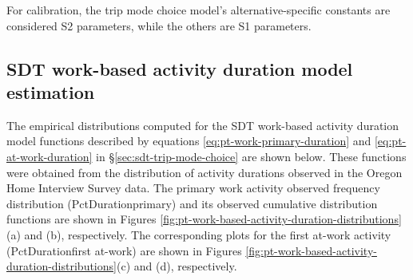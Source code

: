 For calibration, the trip mode choice model's alternative-specific constants are considered S2 parameters, while the others are S1 parameters. 

 
\subsection{SDT work-based activity duration model estimation}
The empirical distributions computed for the SDT work-based activity duration model functions described by equations \ref{eq:pt-work-primary-duration} and \ref{eq:pt-at-work-duration} in \S\ref{sec:sdt-trip-mode-choice} are shown below. These functions were obtained from the distribution of activity durations observed in the Oregon Home Interview Survey data. The primary work activity observed frequency distribution (PctDurationprimary) and its observed cumulative distribution functions are shown in Figures \ref{fig:pt-work-based-activity-duration-distributions}(a) and (b), respectively. The corresponding plots for the first at-work activity (PctDurationfirst at-work) are shown in Figures \ref{fig:pt-work-based-activity-duration-distributions}(c) and (d), respectively. 


